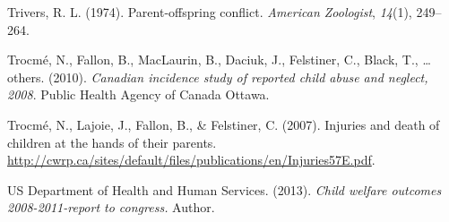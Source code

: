 \documentclass[review]{elsarticle}\usepackage[]{graphicx}\usepackage[]{color}
\begin{document}
Trivers, R. L. (1974). Parent-offspring conflict. \emph{American
Zoologist}, \emph{14}(1), 249--264.

Trocm{é}, N., Fallon, B., MacLaurin, B., Daciuk, J., Felstiner, C.,
Black, T., \ldots{} others. (2010). \emph{Canadian incidence study of
reported child abuse and neglect, 2008}. Public Health Agency of Canada
Ottawa.

Trocm{é}, N., Lajoie, J., Fallon, B., \& Felstiner, C. (2007). Injuries
and death of children at the hands of their parents.
\url{http://cwrp.ca/sites/default/files/publications/en/Injuries57E.pdf}.

US Department of Health and Human Services. (2013). \emph{Child welfare
outcomes 2008-2011-report to congress.} Author.
\end{document}
